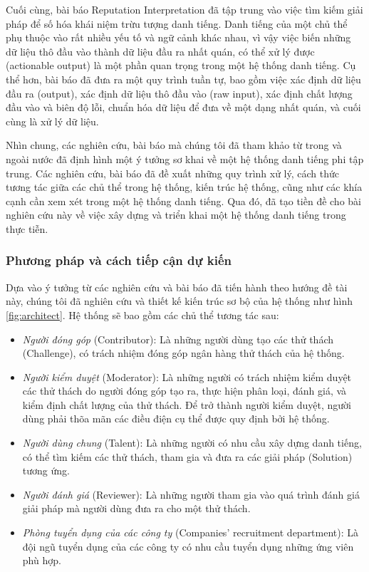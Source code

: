\documentclass{article}[14pt]
\begin{document}
{            \par
            Cuối cùng, bài báo Reputation Interpretation \cite{reputation-interpretation} đã tập trung vào việc tìm kiếm giải pháp để số hóa khái niệm trừu tượng danh tiếng. Danh tiếng của một chủ thể phụ thuộc vào rất nhiều yếu tố và ngữ cảnh khác nhau, vì vậy việc biến những dữ liệu thô đầu vào thành dữ liệu đầu ra nhất quán, có thể xử lý được (actionable output) là một phần quan trọng trong một hệ thống danh tiếng. Cụ thể hơn, bài báo đã đưa ra một quy trình tuần tự, bao gồm việc xác định dữ liệu đầu ra (output), xác định dữ liệu thô đầu vào (raw input), xác định chất lượng đầu vào và biên độ lỗi, chuẩn hóa dữ liệu để đưa về một dạng nhất quán, và cuối cùng là xử lý dữ liệu.
            \par
            Nhìn chung, các nghiên cứu, bài báo mà chúng tôi đã tham khảo từ trong và ngoài nước đã định hình một ý tưởng sơ khai về một hệ thống danh tiếng phi tập trung. Các nghiên cứu, bài báo đã đề xuất những quy trình xử lý, cách thức tương tác giữa các chủ thể trong hệ thống, kiến trúc hệ thống, cũng như các khía cạnh cần xem xét trong một hệ thống danh tiếng. Qua đó, đã tạo tiền đề cho bài nghiên cứu này về việc xây dựng và triển khai một hệ thống danh tiếng trong thực tiễn.  

        \subsubsection{Phương pháp và cách tiếp cận dự kiến}
            Dựa vào ý tưởng từ các nghiên cứu và bài báo đã tiến hành theo hướng đề tài này, chúng tôi đã nghiên cứu và thiết kế kiến trúc sơ bộ của hệ thống như hình \ref{fig:architect}. Hệ thống sẽ bao gồm các chủ thể tương tác sau: 
            \begin{itemize}
                \item \textit{Người đóng góp} (Contributor): Là những người dùng tạo các thử thách (Challenge), có trách nhiệm đóng góp ngân hàng thử thách của hệ thống.
                \item \textit{Người kiểm duyệt} (Moderator): Là những người có trách nhiệm kiểm duyệt các thử thách do người đóng góp tạo ra, thực hiện phân loại, đánh giá, và kiểm định chất lượng của thử thách. Để trở thành người kiểm duyệt, người dùng phải thõa mãn các điều điện cụ thể được quy định bởi hệ thống. 
                \item \textit{Người dùng chung} (Talent): Là những người có nhu cầu xây dựng danh tiếng, có thể tìm kiếm các thử thách, tham gia và đưa ra các giải pháp (Solution) tương ứng.
                \item \textit{Người đánh giá} (Reviewer): Là những người tham gia vào quá trình đánh giá giải pháp mà người dùng đưa ra cho một thử thách.
                \item \textit{Phòng tuyển dụng của các công ty} (Companies' recruitment department): Là đội ngũ tuyển dụng của các công ty có nhu cầu tuyển dụng những ứng viên phù hợp.
            \end{itemize}

}
\end{document}
